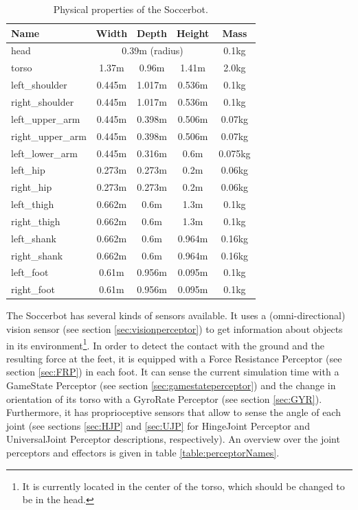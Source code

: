 \begin{table}
\centering
\begin{tabular}[htbp]{|l|c|c|c|c|}
  \hline
  Name & Width & Depth & Height & Mass \\
  \hline\hline
  head & \multicolumn{3}{|c|}{0.39m (radius)} & 0.1kg\\ \hline
  torso & 1.37m & 0.96m & 1.41m & 2.0kg \\ \hline
  left\_shoulder & 0.445m & 1.017m & 0.536m & 0.1kg \\ \hline
  right\_shoulder & 0.445m & 1.017m & 0.536m & 0.1kg \\ \hline
  left\_upper\_arm & 0.445m & 0.398m & 0.506m & 0.07kg \\ \hline
  right\_upper\_arm & 0.445m & 0.398m & 0.506m & 0.07kg \\ \hline
  left\_lower\_arm & 0.445m & 0.316m & 0.6m & 0.075kg \\ \hline
  left\_hip & 0.273m & 0.273m & 0.2m & 0.06kg \\ \hline
  right\_hip & 0.273m & 0.273m & 0.2m & 0.06kg \\ \hline
  left\_thigh & 0.662m & 0.6m & 1.3m & 0.1kg \\ \hline
  right\_thigh & 0.662m & 0.6m & 1.3m & 0.1kg \\ \hline
  left\_shank & 0.662m & 0.6m & 0.964m & 0.16kg \\ \hline
  right\_shank & 0.662m & 0.6m & 0.964m & 0.16kg \\ \hline
  left\_foot & 0.61m & 0.956m & 0.095m & 0.1kg \\ \hline
  right\_foot & 0.61m & 0.956m & 0.095m & 0.1kg \\
  \hline
\end{tabular}
\caption{Physical properties of the Soccerbot.}
\label{table:dimensions}
\end{table}%

The Soccerbot has several kinds of sensors available. It uses a (omni-directional) vision sensor (see section \ref{sec:visionperceptor}) to get information about objects in its environment\footnote{It is currently located in the center of the torso, which should be changed to be in the head.}. In order to detect the contact with the ground and the resulting force at the feet, it is equipped with a Force Resistance Perceptor (see section \ref{sec:FRP}) in each foot. It can sense the current simulation time with a GameState Perceptor (see section \ref{sec:gamestateperceptor}) and the change in orientation of its torso with a GyroRate Perceptor (see section \ref{sec:GYR}). Furthermore, it has proprioceptive sensors that allow to sense the angle of each joint (see sections \ref{sec:HJP} and \ref{sec:UJP} for HingeJoint Perceptor and UniversalJoint Perceptor descriptions, respectively). An overview over the joint perceptors and effectors is given in table \ref{table:perceptorNames}.

